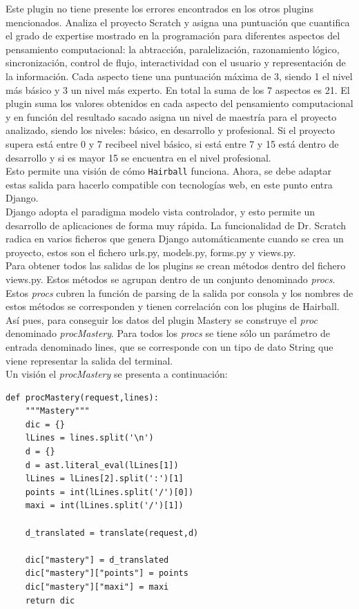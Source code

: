 \documentclass[a4paper, 12pt]{book}
\begin{document}
Este plugin no tiene presente los errores encontrados en los otros plugins mencionados.
Analiza el proyecto Scratch y asigna una puntuación que cuantifica el grado de expertise
mostrado en la programación para diferentes aspectos del pensamiento computacional: la
abtracción, paralelización, razonamiento lógico, sincronización, control de flujo,
interactividad con el usuario y representación de la información. Cada aspecto tiene
una puntuación máxima de 3, siendo 1 el nivel más básico y 3 un nivel más experto. En
total la suma de los 7 aspectos es 21. El plugin suma los valores obtenidos en cada 
aspecto del pensamiento computacional y en función del resultado sacado asigna un
nivel de maestría para el proyecto analizado, siendo los niveles: básico, en desarrollo
y profesional. Si el proyecto supera está entre 0 y 7 recibeel nivel básico, si está 
entre 7 y 15 está dentro de desarrollo y si es mayor 15 se encuentra en el nivel
profesional. \\

Esto permite una visión de cómo \texttt{Hairball} funciona. Ahora, se debe adaptar estas
salida para hacerlo compatible con tecnologías web, en este punto entra Django.  \\

Django adopta el paradigma modelo vista controlador, y esto permite un desarrollo de 
aplicaciones de forma muy rápida. La funcionalidad de Dr. Scratch radica en varios 
ficheros que genera Django automáticamente cuando se crea un proyecto, estos son el
fichero urls.py, models.py, forms.py y views.py. \\

Para obtener todos las salidas de los plugins se crean métodos dentro del fichero views.py.
Estos métodos se agrupan dentro de un conjunto denominado \emph{procs}. Estos \emph{procs}
cubren la función de parsing de la salida por consola y los nombres de estos métodos se
corresponden y tienen correlación con los plugins de Hairball. Así pues, para conseguir 
los datos del plugin Mastery se construye el \emph{proc} denominado \emph{procMastery}. 
Para todos los \emph{procs} se tiene sólo un parámetro de entrada denominado lines, que se
corresponde con un tipo de dato String que viene representar la salida del terminal. \\

Un visión el \emph{procMastery} se presenta a continuación:
\begingroup
\fontsize{8pt}{9pt}\selectfont
\begin{verbatim}
def procMastery(request,lines):
    """Mastery"""
    dic = {}
    lLines = lines.split('\n')
    d = {}
    d = ast.literal_eval(lLines[1])
    lLines = lLines[2].split(':')[1]
    points = int(lLines.split('/')[0])
    maxi = int(lLines.split('/')[1])
    
    d_translated = translate(request,d)

    dic["mastery"] = d_translated
    dic["mastery"]["points"] = points
    dic["mastery"]["maxi"] = maxi
    return dic
\end{verbatim}
\endgroup
\end{document}
